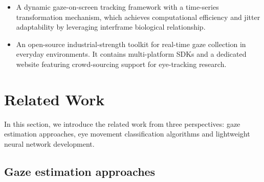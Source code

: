 \documentclass[acmlarge]{acmart}
\begin{document}
\begin{itemize}
\item A dynamic gaze-on-screen tracking framework with a time-series transformation mechanism, which achieves computational efficiency and jitter adaptability by leveraging interframe biological relationship.
\item An open-source industrial-strength toolkit for real-time gaze collection in everyday environments. It contains multi-platform SDKs and a dedicated website featuring crowd-sourcing support for eye-tracking research.

\end{itemize}

\section{Related Work}
In this section, we introduce the related work from three perspectives: gaze estimation approaches, eye movement classification algorithms and lightweight neural network development.

\subsection{Gaze estimation approaches}
\end{document}
